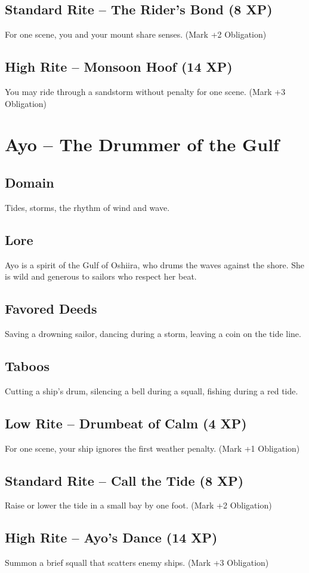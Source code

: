 \documentclass[11pt]{book}
\begin{document}
\subsection*{Standard Rite -- The Rider's Bond (8 XP)}
For one scene, you and your mount share senses. (Mark +2 Obligation)
\subsection*{High Rite -- Monsoon Hoof (14 XP)}
You may ride through a sandstorm without penalty for one scene. (Mark +3 Obligation)

\section{Ayo -- The Drummer of the Gulf}
\subsection*{Domain}
Tides, storms, the rhythm of wind and wave.
\subsection*{Lore}
Ayo is a spirit of the Gulf of Oshiira, who drums the waves against the shore. She is wild and generous to sailors who respect her beat.
\subsection*{Favored Deeds}
Saving a drowning sailor, dancing during a storm, leaving a coin on the tide line.
\subsection*{Taboos}
Cutting a ship's drum, silencing a bell during a squall, fishing during a red tide.
\subsection*{Low Rite -- Drumbeat of Calm (4 XP)}
For one scene, your ship ignores the first weather penalty. (Mark +1 Obligation)
\subsection*{Standard Rite -- Call the Tide (8 XP)}
Raise or lower the tide in a small bay by one foot. (Mark +2 Obligation)
\subsection*{High Rite -- Ayo's Dance (14 XP)}
Summon a brief squall that scatters enemy ships. (Mark +3 Obligation)
\end{document}
